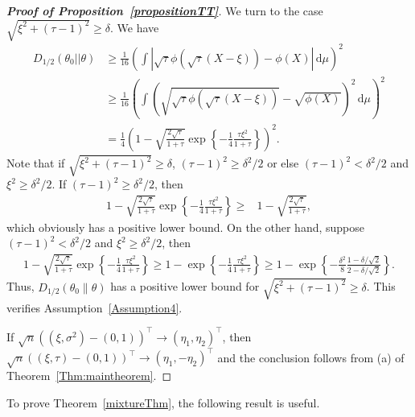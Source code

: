 \documentclass[11pt]{article}
\theoremstyle{plain}
\theoremstyle{definition}
\theoremstyle{remark}
\begin{document}
\begin{appendices}
\begin{proof}[\textbf{Proof of Proposition~\ref{propositionTT}}]
We turn to the case $\sqrt{\xi^2+(\tau-1)^2}\geq\delta$.
We have
\begin{equation*}
    \begin{split}
    D_{1/2}(\theta_0||\theta)
    &\geq
    \frac{1}{16}
    \left(\int \left|\sqrt{\tau}\phi(\sqrt{\tau}(X-\xi))-\phi(X)\right| \, \mathrm d\mu\right)^2
    \\
    &\geq
    \frac{1}{16}
\left(
\int \left(\sqrt{\sqrt{\tau}\phi(\sqrt{\tau}(X-\xi))}-\sqrt{\phi(X)}\right)^2 \, \mathrm d\mu
\right)^2
\\
&=
\frac{1}{4} 
\left( 
1- \sqrt{\frac{2 \sqrt \tau }{1+\tau}} \exp \left\{ - \frac{1}{4} \frac{\tau \xi^2}{1+\tau } \right\}
\right)^2
    .
\end{split}
\end{equation*}
Note that if $\sqrt{\xi^2 + (\tau-1)^2} \geq \delta$, $(\tau-1)^2 \geq \delta^2/2$ or else $(\tau-1)^2 < \delta^2/2$ and $\xi^2 \geq \delta^2/2$.
If $(\tau-1)^2 \geq \delta^2/2$, then
\begin{align*}
1- \sqrt{\frac{2 \sqrt \tau }{1+\tau}} \exp \left\{ - \frac{1}{4} \frac{\tau \xi^2}{1+\tau } \right\}
\geq&
1- \sqrt{\frac{2 \sqrt \tau }{1+\tau}} 
,
\end{align*}
which obviously has a positive lower bound.
On the other hand, suppose $(\tau-1)^2 < \delta^2/2$ and $\xi^2 \geq \delta^2/2$,
then
\begin{align*}
1- \sqrt{\frac{2 \sqrt \tau }{1+\tau}} \exp \left\{ - \frac{1}{4} \frac{\tau \xi^2}{1+\tau } \right\}
\geq 
1- \exp \left\{ - \frac{1}{4} \frac{\tau \xi^2}{1+\tau } \right\}
\geq 
1- \exp \left\{ - \frac{\delta^2}{8} \frac{1-\delta/\sqrt 2}{2-\delta /\sqrt 2} \right\}.
\end{align*}
Thus, $D_{1/2}(\theta_0 \| \theta)$ has a positive lower bound for $\sqrt{\xi^2+(\tau-1)^2}\geq\delta$.
This verifies Assumption~\ref{Assumption4}.

If $\sqrt{n}((\xi,\sigma^2)-(0,1))^\top \to (\eta_1,\eta_2)^\top  $, then $\sqrt{n}((\xi,\tau)-(0,1))^\top \to (\eta_1,-\eta_2)^\top  $ and the conclusion follows from (a) of Theorem~\ref{Thm:maintheorem}.
\end{proof}


To prove Theorem~\ref{mixtureThm}, the following result is useful.


\end{appendices}
\end{document}
